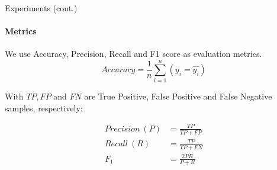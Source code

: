 \begin{frame}{Experiments (cont.)}
\framesubtitle{Metrics}

We use Accuracy, Precision, Recall and F1 score as evaluation metrics.
\begin{equation}
Accuracy  = \displaystyle\frac{1}{n}\sum_{i = 1}^n (y_i = \hat{y_i})
\end{equation}

With $TP, FP$ and $FN$ are True Positive, False Positive and False Negative samples, respectively:

\begin{equation}
\begin{aligned}
Precision\ (P) &= \frac{TP}{TP + FP} \\
Recall\ (R) &= \frac{TP}{TP + FN} \\
F_{1} &= \frac{2PR}{P + R}    
\end{aligned}
\end{equation}
\end{frame}





